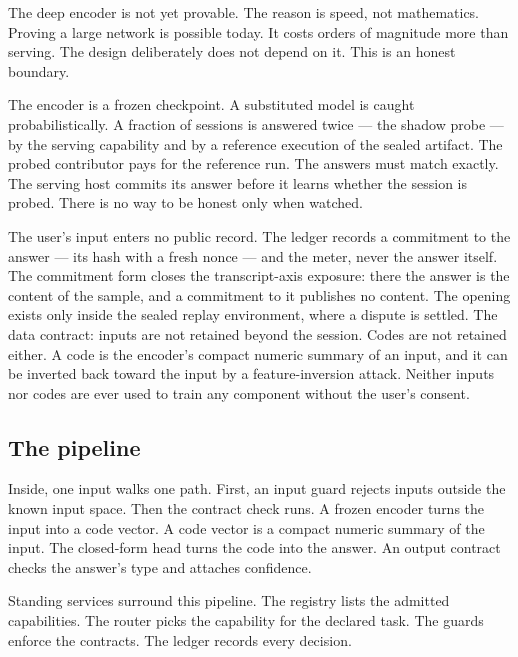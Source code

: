 \documentclass[11pt]{article}
\begin{document}
The deep encoder is not yet provable. The reason is speed, not
mathematics. Proving a large network is possible today. It costs
orders of magnitude more than serving. The design deliberately
does not depend on it. This is an honest boundary.

The encoder is a frozen checkpoint. A substituted model is caught
probabilistically. A fraction of sessions is answered twice ---
the shadow probe --- by the serving capability and by a reference
execution of the sealed artifact. The probed contributor pays for
the reference run. The
answers must match exactly. The serving host commits its answer
before it learns whether the session is probed. There is no way
to be honest only when watched.

The user's input enters no public record. The ledger records a
commitment to the answer --- its hash with a fresh nonce --- and
the meter, never the answer itself. The commitment form closes
the transcript-axis exposure: there the answer is the content of
the sample, and a commitment to it publishes no content. The
opening exists only inside the sealed replay environment, where a
dispute is settled. The data contract: inputs are not retained beyond the
session. Codes are not retained either. A code is the encoder's
compact numeric summary of an input, and it can be inverted back
toward the input by a feature-inversion attack. Neither inputs
nor codes are ever used to train any component without the
user's consent.

\subsection{The pipeline}

Inside, one input walks one path. First, an input guard rejects
inputs outside the known input space. Then the contract check
runs. A frozen encoder turns the input into a code vector. A code
vector is a compact numeric summary of the input. The closed-form
head turns the code into the answer. An output contract checks the
answer's type and attaches confidence.

Standing services surround this pipeline. The registry lists the
admitted capabilities. The router picks the capability for the
declared task. The guards enforce the contracts. The ledger
records every decision.
\end{document}
